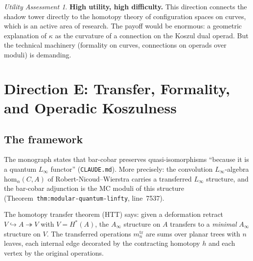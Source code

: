 \documentclass[11pt]{article}
\theoremstyle{definition}
\theoremstyle{remark}
\newtheorem*{assessment}{Utility Assessment}
\begin{document}
\begin{assessment}
\textbf{High utility, high difficulty.}  This direction connects
the shadow tower directly to the homotopy theory of configuration
spaces on curves, which is an active area of research.  The
payoff would be enormous: a geometric explanation of $\kappa$ as
the curvature of a connection on the Koszul dual operad.  But the
technical machinery (formality on curves, connections on operads
over moduli) is demanding.
\end{assessment}

\section{Direction E: Transfer, Formality, and Operadic Koszulness}

\subsection{The framework}

The monograph states that bar-cobar preserves quasi-isomorphisms
``because it is a quantum $L_\infty$ functor''
(\texttt{CLAUDE.md}).  More precisely: the convolution
$L_\infty$-algebra $\mathrm{hom}_\alpha(C, A)$ of
Robert-Nicoud--Wierstra carries a transferred $L_\infty$ structure,
and the bar-cobar adjunction is the MC moduli of this structure
(Theorem~\texttt{thm:modular-quantum-linfty}, line~7537).

The homotopy transfer theorem (HTT) says: given a deformation
retract $V \hookrightarrow A \twoheadrightarrow V$ with
$V = H^*(A)$, the $A_\infty$ structure on $A$ transfers to a
\emph{minimal} $A_\infty$ structure on $V$.  The transferred
operations $m_n^{\mathrm{tr}}$ are sums over planar trees with
$n$ leaves, each internal edge decorated by the contracting
homotopy $h$ and each vertex by the original operations.
\end{document}
